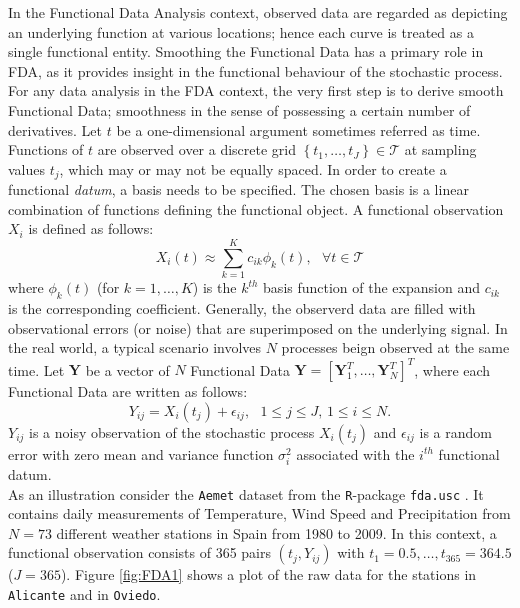 In the Functional Data Analysis context, observed data are regarded as depicting an underlying function at various locations; hence each curve is treated as a single functional entity. Smoothing the Functional Data has a primary role in FDA, as it provides insight in the functional behaviour of the stochastic process.\\
For any data analysis in the FDA context, the very first step is to derive smooth Functional Data; smoothness in the sense of possessing a certain number of derivatives. Let $t$ be a one-dimensional argument sometimes referred as time. Functions of $t$ are observed over a discrete grid $\left\lbrace t_{1},\dots,t_{J} \right\rbrace \in \mathcal{T}$ at sampling values $t_j$, which may or may not be equally spaced. In order to create a functional \textit{datum}, a basis needs to be specified. The chosen basis is a linear combination of functions defining the functional object. A functional observation $X_i$ is defined as follows:
\begin{equation}\label{fda_21}
X_i(t) \approx \sum_{k=1}^{K} c_{ik}\phi_{k}(t),\text{ }\forall t \in \mathcal{T}
\end{equation}
where $\phi_{k}(t)$ (for $k = 1,\dots,K$) is the $k^{th}$ basis function of the expansion and $c_{ik}$ is the corresponding coefficient. Generally, the observerd data are filled with observational errors (or noise) that are superimposed on the underlying signal. In the real world, a typical scenario involves $N$ processes beign observed at the same time. Let $\mathbf{Y}$ be a vector of $N$ Functional Data $\bm{Y} = \left[\bm{Y}^T_{1},\dots,\bm{Y}^T_{N}\right]^T$, where each Functional Data are written as follows:
\begin{equation}\label{fda_22}
Y_{ij} = X_{i}(t_{j}) + \epsilon_{ij},\text{ } 1 \leq j \leq J \text{, } 1 \leq i \leq N.
\end{equation}
$Y_{ij}$ is a noisy observation of the stochastic process $X_{i}(t_j)$ and $\epsilon_{ij}$ is a random error with zero mean and variance function $\sigma^{2}_i$ associated with the $i^{th}$ functional datum. \\
As an illustration consider the \texttt{Aemet} dataset from the \texttt{R}-package \texttt{fda.usc} \citep{fda.usc}. It contains daily measurements of Temperature, Wind Speed and Precipitation from $N = 73$ different weather stations in Spain from 1980 to 2009. In this context, a functional observation consists of 365 pairs $(t_{j},Y_{ij})$ with $t_{1} = 0.5,\dots,t_{365} = 364.5$ ($J = 365$). Figure \ref{fig:FDA1} shows a plot of the raw data for the stations in \texttt{Alicante} and in \texttt{Oviedo}.
